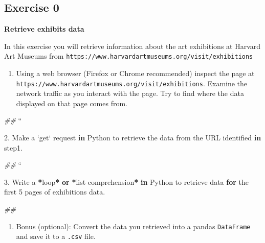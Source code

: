 \documentclass[]{book}
\newenvironment{Shaded}{\begin{snugshade}}{\end{snugshade}}
\newcommand{\KeywordTok}[1]{\textcolor[rgb]{0.13,0.29,0.53}{\textbf{#1}}}
\newcommand{\DecValTok}[1]{\textcolor[rgb]{0.00,0.00,0.81}{#1}}
\newcommand{\ImportTok}[1]{#1}
\newcommand{\CommentTok}[1]{\textcolor[rgb]{0.56,0.35,0.01}{\textit{#1}}}
\newcommand{\ControlFlowTok}[1]{\textcolor[rgb]{0.13,0.29,0.53}{\textbf{#1}}}
\newcommand{\OperatorTok}[1]{\textcolor[rgb]{0.81,0.36,0.00}{\textbf{#1}}}
\newcommand{\BuiltInTok}[1]{#1}
\newcommand{\NormalTok}[1]{#1}
\providecommand{\tightlist}{%
  \setlength{\itemsep}{0pt}\setlength{\parskip}{0pt}}
\begin{document}
\subsection{Exercise 0}\label{exercise-0-4}

\textbf{Retrieve exhibits data}

In this exercise you will retrieve information about the art exhibitions
at Harvard Art Museums from
\texttt{https://www.harvardartmuseums.org/visit/exhibitions}

\begin{enumerate}
\def\labelenumi{\arabic{enumi}.}
\tightlist
\item
  Using a web browser (Firefox or Chrome recommended) inspect the page
  at \texttt{https://www.harvardartmuseums.org/visit/exhibitions}.
  Examine the network traffic as you interact with the page. Try to find
  where the data displayed on that page comes from.
\end{enumerate}

\begin{Shaded}
\begin{Highlighting}[]
\CommentTok{##}
\NormalTok{``}

\DecValTok{2}\NormalTok{. Make a `get` request }\KeywordTok{in}\NormalTok{ Python to retrieve the data }\ImportTok{from}\NormalTok{ the URL}
\NormalTok{   identified }\KeywordTok{in}\NormalTok{ step1.}
\end{Highlighting}
\end{Shaded}

\begin{Shaded}
\begin{Highlighting}[]
\CommentTok{##}
\NormalTok{``}

\DecValTok{3}\NormalTok{. Write a }\OperatorTok{*}\NormalTok{loop}\OperatorTok{*} \KeywordTok{or} \OperatorTok{*}\BuiltInTok{list}\NormalTok{ comprehension}\OperatorTok{*} \KeywordTok{in}\NormalTok{ Python to retrieve data}
   \ControlFlowTok{for}\NormalTok{ the first }\DecValTok{5}\NormalTok{ pages of exhibitions data.}
\end{Highlighting}
\end{Shaded}

\begin{Shaded}
\begin{Highlighting}[]
\CommentTok{##}
\end{Highlighting}
\end{Shaded}

\begin{enumerate}
\def\labelenumi{\arabic{enumi}.}
\setcounter{enumi}{3}
\tightlist
\item
  Bonus (optional): Convert the data you retrieved into a pandas
  \texttt{DataFrame} and save it to a \texttt{.csv} file.
\end{enumerate}
\end{document}
